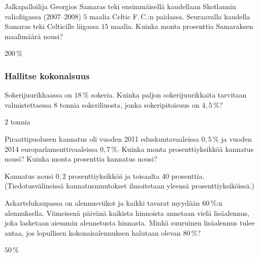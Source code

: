 \begin{tehtavasivu}
\begin{tehtava}
    Jalkapalloilija Georgios Samaras teki ensimmäisellä kaudellaan Skotlannin valioliigassa (2007--2008) $5$ maalia Celtic F.\,C.:n paidassa. Seuraavalla kaudella Samaras teki Celticille liigassa $15$ maalia. Kuinka monta prosenttia Samaraksen maalimäärä nousi?
    \begin{vastaus}
        $200\,\%$
    \end{vastaus}
\end{tehtava}

\subsubsection*{Hallitse kokonaisuus}

\begin{tehtava}
    Sokerijuurikkaassa on $18\,\%$ sokeria. Kuinka paljon sokerijuurikkaita tarvitaan valmistettaessa $8$ tonnia sokeriliuosta, jonka sokeripitoisuus on $4,5\,\%$?
    \begin{vastaus}
        $2$ tonnia
    \end{vastaus}
\end{tehtava}

\begin{tehtava}
    Piraattipuolueen kannatus oli vuoden 2011 eduskuntavaaleissa $0,5\,\%$ ja vuoden 2014 europarlamenttivaaleissa $0,7\,\%$. Kuinka monta prosenttiyksikköä kannatus nousi? Kuinka monta prosenttia kannatus nousi?
    \begin{vastaus}
        Kannatus nousi $0,2$ prosenttiyksikköä ja toisaalta $40$ prosenttia. (Tiedotusvälineissä kannatusmuutokset ilmoitetaan yleensä prosenttiyksiköissä.)
    \end{vastaus}
\end{tehtava}

\begin{tehtava}
    Askartelukaupassa on alennusviikot ja kaikki tavarat myydään $60\,\%$:n alennuksella. Viimeisenä päivänä kaikista hinnoista annetaan vielä lisäalennus, joka lasketaan aiemmin alennetusta hinnasta. Minkä suuruinen lisäalennus tulee antaa, jos lopullisen kokonaisalennuksen halutaan olevan $80\,\%$?
    \begin{vastaus}
        $50\,\%$
    \end{vastaus}
\end{tehtava}


\end{tehtavasivu}
